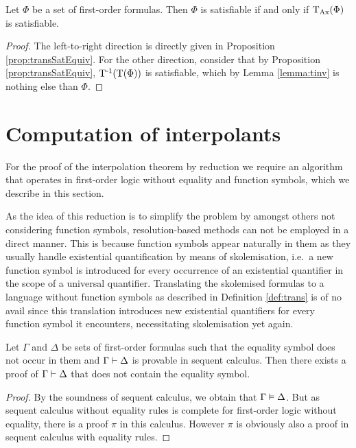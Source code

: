 \begin{corr}
	Let $\Phi$ be a set of first-order formulas.
	Then $\Phi$ is satisfiable if and only if $\operatorname{\operatorname{T}_{Ax}}(\Phi)$ is satisfiable.
\end{corr}
\begin{proof}
	The left-to-right direction is directly given in Proposition \ref{prop:transSatEquiv}.
	For the other direction, consider that by Proposition \ref{prop:transSatEquiv}, $\operatorname{T^{-1}}(\operatorname{T}(\Phi))$ is satisfiable, which by Lemma \ref{lemma:tinv} is nothing else than $\Phi$.
\end{proof}



\section{Computation of interpolants}

For the proof of the interpolation theorem by reduction we require an algorithm that operates in first-order logic without equality and function symbols, which we describe in this section.

\begin{remark}
	As the idea of this reduction is to simplify the problem by amongst others not considering function symbols,
	resolution-based methods can not be employed in a direct manner.
	This is because function symbols appear naturally in them as they usually handle existential quantification by means of skolemisation, i.e.~a new function symbol is introduced for every occurrence of an existential quantifier in the scope of a universal quantifier.
	Translating the skolemised formulas to a language without function symbols as described in Definition \ref{def:trans} is of no avail since this translation introduces new existential quantifiers for every function symbol it encounters, necessitating skolemisation yet again.
\end{remark}


\begin{lemma}
	\label{lemma:no_equality_in_proof}
	 Let $\Gamma$ and $\Delta$ be sets of first-order formulas such that the equality symbol does not occur in them and $\Gamma \vdash \Delta$ is provable in sequent calculus. 
	 Then there exists a proof of $\Gamma \vdash \Delta$ that does not contain the equality symbol.
\end{lemma}
\begin{proof}
	By the soundness of sequent calculus, we obtain that $\Gamma \vDash \Delta$.
	But as sequent calculus without equality rules is complete for first-order logic without equality, there is a proof $\pi$ in this calculus.
	However $\pi$ is obviously also a proof in sequent calculus with equality rules.
\end{proof}

